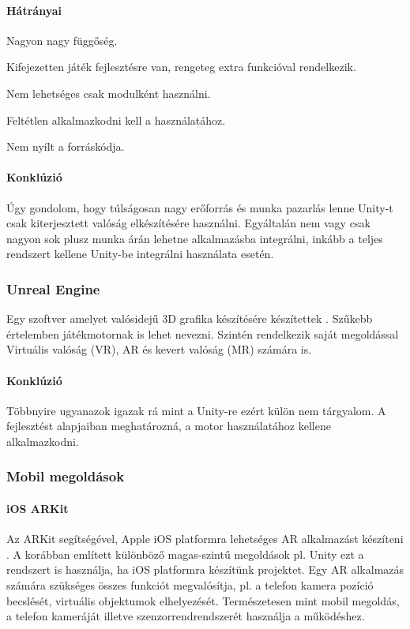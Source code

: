 \documentclass[12pt,a4paper,oneside]{report} %
\begin{document}
\paragraph{Hátrányai} 
\begin{compactitem}
	\item Nagyon nagy függőség.
	\item Kifejezetten játék fejlesztésre van, rengeteg extra funkcióval rendelkezik.
	\item Nem lehetséges csak modulként használni.
	\item Feltétlen alkalmazkodni kell a használatához.
	\item Nem nyílt a forráskódja.
\end{compactitem}
\paragraph{Konklúzió}
Úgy gondolom, hogy túlságosan nagy erőforrás és munka pazarlás lenne Unity-t csak kiterjesztett valóság elkészítésére használni. Egyáltalán nem vagy csak nagyon sok plusz munka árán lehetne alkalmazásba integrálni, inkább a teljes rendszert kellene Unity-be integrálni használata esetén.

\subsubsection{Unreal Engine}
Egy szoftver amelyet valósidejű 3D grafika készítésére készítettek \cite{unrealengine}. Szűkebb értelemben játékmotornak is lehet  nevezni. Szintén rendelkezik saját megoldással Virtuális valóság (VR), AR és kevert valóság (MR) számára is.
\paragraph{Konklúzió} Többnyire ugyanazok igazak rá mint a Unity-re ezért külön nem tárgyalom. A fejlesztést alapjaiban meghatározná, a motor használatához kellene alkalmazkodni.
\subsubsection{Mobil megoldások}
\paragraph{iOS ARKit}
Az ARKit segítségével, Apple iOS platformra lehetséges AR alkalmazást készíteni \cite{arkit}. A korábban említett különböző magas-szintű megoldások pl. Unity ezt a rendszert is használja, ha iOS platformra készítünk projektet. Egy AR alkalmazás számára szükséges összes funkciót megvalósítja, pl. a telefon kamera pozíció becslését, virtuális objektumok elhelyezését. Természetesen mint mobil megoldás, a telefon kameráját illetve szenzorrendrendszerét használja a működéshez.
\end{document}
